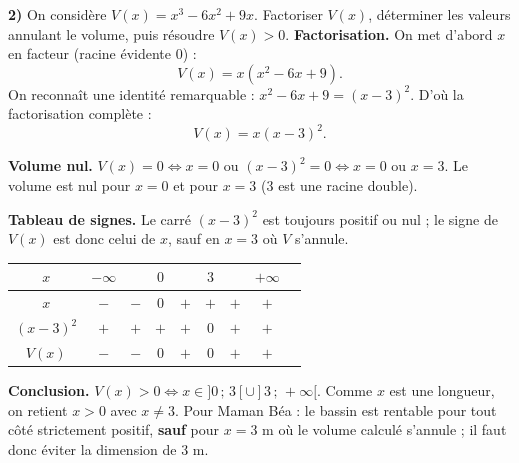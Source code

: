 \documentclass[11pt]{article}
\begin{document}
\begin{exoresolu}
\textbf{2)} On considère $V(x) = x^3 - 6x^2 + 9x$. Factoriser $V(x)$, déterminer les valeurs annulant le volume, puis résoudre $V(x) > 0$.
\tcblower
\textbf{Factorisation.} On met d'abord $x$ en facteur (racine évidente $0$) :
\[ V(x) = x\left(x^2 - 6x + 9\right). \]
On reconnaît une identité remarquable : $x^2 - 6x + 9 = (x-3)^2$. D'où la factorisation complète :
\[ V(x) = x(x-3)^2. \]

\textbf{Volume nul.} $V(x) = 0 \Longleftrightarrow x = 0$ ou $(x-3)^2 = 0 \Longleftrightarrow x = 0$ ou $x = 3$. Le volume est nul pour $x = 0$ et pour $x = 3$ ($3$ est une racine double).

\textbf{Tableau de signes.} Le carré $(x-3)^2$ est toujours positif ou nul ; le signe de $V(x)$ est donc celui de $x$, sauf en $x = 3$ où $V$ s'annule.
\begin{center}
\begin{tabular}{|c|cccccccc|}
\hline
$x$ & $-\infty$ & & $0$ & & $3$ & & $+\infty$ \\
\hline
$x$ & $-$ & $-$ & $0$ & $+$ & $+$ & $+$ & $+$ \\
\hline
$(x-3)^2$ & $+$ & $+$ & $+$ & $+$ & $0$ & $+$ & $+$ \\
\hline
$V(x)$ & $-$ & $-$ & $0$ & $+$ & $0$ & $+$ & $+$ \\
\hline
\end{tabular}
\end{center}

\textbf{Conclusion.} $V(x) > 0 \Longleftrightarrow x \in ]0\,;\,3[ \cup ]3\,;\,+\infty[$. Comme $x$ est une longueur, on retient $x > 0$ avec $x \neq 3$. Pour Maman Béa : le bassin est rentable pour tout côté strictement positif, \textbf{sauf} pour $x = 3$ m où le volume calculé s'annule ; il faut donc éviter la dimension de 3 m.
\end{exoresolu}
\end{document}
